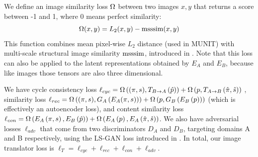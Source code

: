 \documentclass{article}
\begin{document}
		
		We define an image similarity loss $\Omega$ between two images $x,y$ that returns a score between -1 and 1, where 0 means perfect similarity:
		\begin{equation}
			\Omega(x,y) = L_2(x,y)-\text{msssim}(x,y) 
		\end{equation}
		This function combines mean pixel-wise $L_2$ distance (used in MUNIT) with multi-scale structural image similarity $\text{msssim}$, introduced in \citep{msssim}. Note that this loss can also be applied to the latent representations obtained by $E_A$ and $E_B$, because like images those tensors are also three dimensional.



		We have cycle consistency loss ${\ell_{cyc}  =  \Omega\left((\pi,s),T_{B\rightarrow A}\left(\hat{p}\right)\right)  +  \Omega\left(p,T_{A\rightarrow B}\left(\hat{\pi},\hat{s}\right)\right)}$
		, similarity loss ${\ell_{rec} = \Omega\left((\pi,s),G_A\left(E_A(\pi,s)\right)\right) + \Omega\left(p,G_B\left(E_B\left(p\right)\right)\right)}$
			(which is effectively an autoencoder loss),   
		and content similarity loss ${ \ell_{con} = \Omega\left(E_A\left(\pi,s\right), E_B\left(\hat{p}\right) \right)    +   \Omega\left(E_A\left(p\right),E_A\left(\hat{\pi},\hat{s}\right)\right) }$.
		We also have adversarial losses $\ell_{adv}$ that come from two discriminators $D_A$ and $D_B$, targeting domains A and B respectively, using the LS-GAN loss introduced in \citet{lsgan}. 
		In total, our image translator loss is $\ell_T=\ell_{cyc}+\ell_{rec}+\ell_{con}+\ell_{adv}$.
\end{document}
